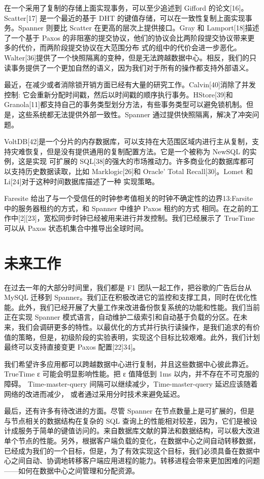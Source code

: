 \documentclass[letterpaper,twocolumn,10pt]{article}
\begin{document}
在一个采用了复制的存储上面实现事务，可以至少追述到 Gifford 的论文[16]。Scatter[17] 是一个最近的基于 DHT 的键值存储，可以在一致性复制上面实现事务。Spanner 则要比 Scatter 在更高的层次上提供接口。Gray 和 Lamport[18]描述了一个基于 Paxos 的非阻塞的提交协议，他们的协议会比两阶段提交协议带来更多的代价，而两阶段提交协议在大范围分布 式的组中的代价会进一步恶化。Walter[36]提供了一个快照隔离的变种，但是无法跨越数据中心。相反，我们的只读事务提供了一个更加自然的语义，因为我们对于所有的操作都支持外部语义。

最近，在减少或者消除锁开销方面已经有大量的研究工作。Calvin[40]消除了并发控制: 它会重新分配时间戳，然后以时间戳的顺序执行事务。HStore[39]和 Granola[11]都支持自己的事务类型划分方法，有些事务类型可以避免锁机制。但是，这些系统都无法提供外部一致性。Spanner 通过提供快照隔离，解决了冲突问题。

VoltDB[42]是一个分片的内存数据库，可以支持在大范围区域内进行主从复制，支持灾难恢复，但是没有提供通用的复制配置方法。它是一个被称为 NewSQL 的实例，这是实现 可扩展的 SQL[38]的强大的市场推动力。许多商业化的数据库都可以支持历史数据读取，比如 Marklogic[26]和 Oracle’ Total Recall[30]。Lomet 和 Li[24]对于这种时间数据库描述了一种 实现策略。

Faresite 给出了与一个受信任的时钟参考值相关的时钟不确定性的边界13:Farsite 中的服务器租约的方式，和 Spanner 中维护 Paxos 租约的方式 相同。在之前的工作中[2][23]，宽松同步时钟已经被用来进行并发控制。我们已经展示了 TrueTime 可以从 Paxos 状态机集合中推导出全球时间。

\section{未来工作}

在过去一年的大部分时间里，我们都是 F1 团队一起工作，把谷歌的广告后台从 MySQL 迁移到 Spanner。我们正在积极改进它的监控和支撑工具，同时在优化性能。此外，我们已经开展了大量工作来改进备份恢复系统的功能和性能。我们当前正在实现 Spanner 模式语言，自动维护二级索引和自动基于负载的分区。在未来，我们会调研更多的特性。以最优化的方式并行执行读操作，是我们追求的有价值的策略，但是，初级阶段的实验表明，实现这个目标比较艰难。此外，我们计划最终可以支持直接变更 Paxos 配置[22]34]。

我们希望许多应用都可以跨越数据中心进行复制，并且这些数据中心彼此靠近。 TrueTime ε 可能会明显影响性能。把 ε 值降低到 1ms 以内，并不存在不可克服的障碍。 Time-master-query 间隔可以继续减少，Time-master-query 延迟应该随着网络的改进而减少， 或者通过采用分时技术来避免延迟。

最后，还有许多有待改进的方面。尽管 Spanner 在节点数量上是可扩展的，但是与节点相关的数据结构在复杂的 SQL 查询上的性能相对较差，因为，它们是被设计成服务于简单的键值访问的。来自数据库文献的算法和数据结构，可以极大改进单个节点的性能。另外，根据客户端负载的变化，在数据中心之间自动转移数据，已经成为我们的一个目标，但是，为了有效实现这个目标，我们必须具备在数据中心之间自动、协调地转移客户端应用进程的能力。转移进程会带来更加困难的问题——如何在数据中心之间管理和分配资源。
\end{document}
